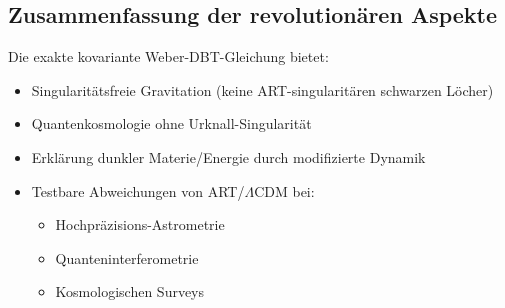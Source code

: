 \subsection{Zusammenfassung der revolutionären Aspekte}
Die exakte kovariante Weber-DBT-Gleichung bietet:
\begin{itemize}
\item Singularitätsfreie Gravitation (keine ART-singularitären schwarzen Löcher)
\item Quantenkosmologie ohne Urknall-Singularität
\item Erklärung dunkler Materie/Energie durch modifizierte Dynamik
\item Testbare Abweichungen von ART/$\Lambda$CDM bei:
\begin{itemize}
\item Hochpräzisions-Astrometrie
\item Quanteninterferometrie
\item Kosmologischen Surveys
\end{itemize}
\end{itemize}
